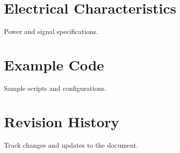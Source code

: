 \appendix
\section{Electrical Characteristics}
Power and signal specifications.
\section{Example Code}
Sample scripts and configurations.
\section{Revision History}
Track changes and updates to the document.